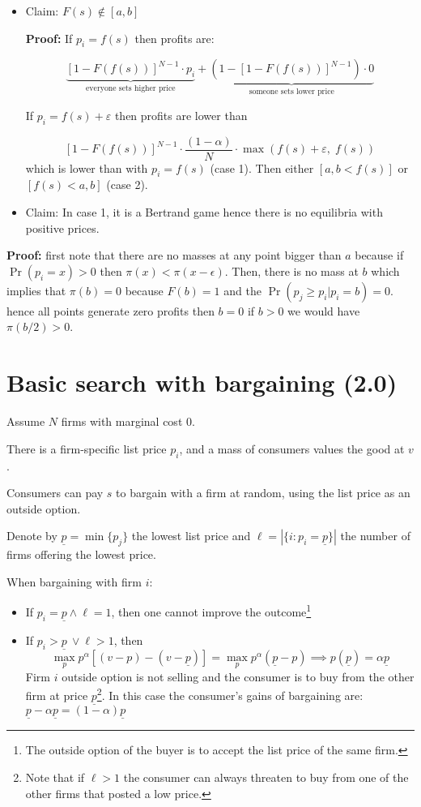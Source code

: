 \documentclass[12pt]{article}
\theoremstyle{plain}
\theoremstyle{plain}
\begin{document}
\begin{itemize}
    \item Claim: $F(s) \notin [a,b]$
 

\textbf{Proof:} If $p_i = f(s)$ then profits are:

\[
\underbrace{[1 - F(f(s))]^{N-1} \cdot p_i}_{\text{everyone sets higher price}} + 
\underbrace{(1 - \left[1 - F(f(s))\right]^{N-1}) \cdot 0}_{\text{someone sets lower price}}
\]


If $p_i = f(s) + \varepsilon$ then profits are lower than

\[
[1 - F(f(s))]^{N-1} \cdot \frac{(1 - \alpha)}{N} \cdot \max(f(s)+\varepsilon,\; f(s))
\]
which is lower than with  $p_i = f(s)$ (case 1). Then either $[a,b < f(s)]$ or $[f(s)< a,b]$ (case 2). 

\item Claim: In case 1, it is a Bertrand game hence there is no equilibria with positive prices. 
\end{itemize}

\textbf{Proof:} first note that there are no masses at any point bigger than $a$ because if $\Pr(p_i = x) > 0$ then $\pi(x) < \pi(x-\epsilon)$. Then, there is no mass at $b$ which implies that $\pi(b) = 0$ because $F(b) =1 $ and the $\Pr(p_j \geq p_i| p_i = b) =  0 $. hence all points generate zero profits then $b =0 $ if $b> 0$ we would have $\pi(b/2) > 0$. 


\section{Basic search with bargaining (2.0)}


Assume $N$ firms with marginal cost $0$.

There is a firm-specific list price $p_i$, and a mass of consumers values the good at $v$.

Consumers can pay $s$ to bargain with a firm at random, using the list price as an outside option.



Denote by $\underline{p} = \min\{p_j\}$  the lowest list price and $\ell = |\{i: p_i = \underline{p}\}|$ the number of firms offering the lowest price. 


When bargaining with firm $i$:
\begin{itemize}
    \item If $p_i = \underline{p}  \land \ell =1 $, then one cannot improve the outcome\footnote{The outside option of the buyer is to accept the list price of the same firm.}
    
    \item If $p_i >  \underline{p} \ \lor \ell > 1  $, then
    \[
    \max_{p} p^\alpha [(v - p) - (v - \underline{p} )] = \max_{p} p^\alpha (\underline{p}  - p) \implies p(\underline{p} ) = \alpha \underline{p} 
    \]
    Firm $i$ outside option is not selling and the consumer is to buy from the other firm at price $\underline{p} $\footnote{Note that if $\ell > 1$  the consumer can always threaten to buy from one of the other firms that posted a low price.}. In this case the consumer's gains of bargaining are:  $\underline{p} - \alpha \underline{p}  = (1-\alpha) \underline{p} $
\end{itemize}
\end{document}
